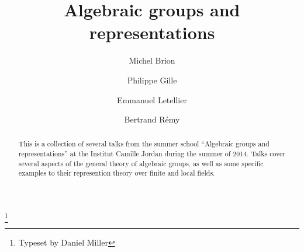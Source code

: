 \documentclass[english,letterpaper]{smfart}
\author{Michel Brion}
\author{Philippe Gille}
\author{Emmanuel Letellier}
\author{Bertrand R\'emy}
\title[Algebraic groups]{Algebraic groups and representations}
\begin{document}
\frontmatter

\begin{abstract}
This is a collection of several talks from the summer school ``Algebraic 
groups and representations'' at the Institut Camille Jordan during the 
summer of 2014.
Talks cover several aspects of the general theory of algebraic groups, as well 
as some specific examples to their represention theory over finite and local 
fields. 
\end{abstract}

\thanks{Typeset by Daniel Miller}

\maketitle
\tableofcontents
\mainmatter













\backmatter


\end{document}
